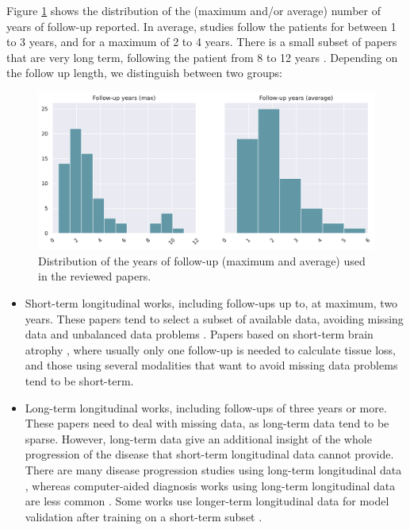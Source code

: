Figure \ref{fig:followups_years} shows the distribution of the (maximum and/or average) number of years of follow-up reported. In average, studies follow the patients for between 1 to 3 years, and for a maximum of 2 to 4 years. There is a small subset of papers that are very long term, following the patient from 8 to 12 years \cite{Ghazi2019,Chen2012,Li2017b,Li2017c,Bilgel2015a,Bilgel2016}. Depending on the follow up length, we distinguish between two groups:

\begin{figure}[!htbp]
\centering
\includegraphics[width=1.0\textwidth]{figures/review/Fig4.pdf}
    \caption[Distribution of the years of follow-up used in the reviewed papers.]{Distribution of the years of follow-up (maximum and average) used in the reviewed papers.}\label{fig:followups_years}
\end{figure}

\begin{itemize}\itemsep7pt

\item Short-term longitudinal works, including follow-ups up to, at maximum, two years. These papers tend to select a subset of available data, avoiding missing data and unbalanced data problems \cite{Ardekani2016,Fiot2012,Fiot2014,Gray2012,Rodrigues2014,Shi2015,Shi2017}. Papers based on short-term brain atrophy \cite{Huang2012,Hyun2016,McEvoy2011,Sanroma2017,Vounou2012}, where usually only one follow-up is needed to calculate tissue loss, and those using several modalities that want to avoid missing data problems \cite{Chen2011b,Hinrichs2011,Jack2009} tend to be short-term.

\item Long-term longitudinal works, including follow-ups of three years or more. These papers need to deal with missing data, as long-term data tend to be sparse. However, long-term data give an additional insight of the whole progression of the disease that short-term longitudinal data cannot provide. There are many disease progression studies using long-term longitudinal data \cite{Desikan2011,Guillaume2014,Guerrero2016,Bilgel2015a,Bilgel2016,Iturria-Medina2016,Li2017b,Aghili2018}, whereas computer-aided diagnosis works using long-term longitudinal data are less common \cite{Chi2017,Minhas2016}. Some works use longer-term longitudinal data for model validation after training on a short-term subset \cite{Young2015a}.
\end{itemize}

